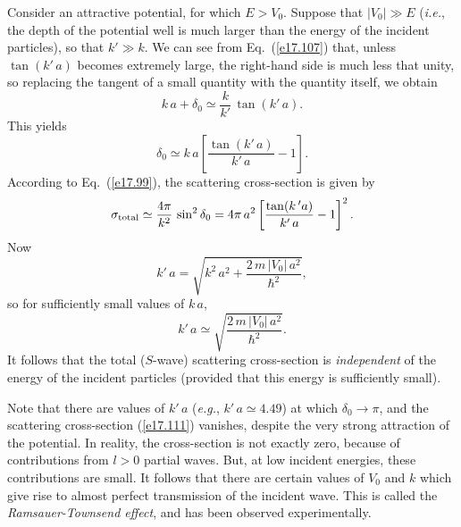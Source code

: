 Consider an attractive potential, for which $E>V_0$. Suppose that 
$|V_0|\gg E$ ({\em i.e.}, the depth of the potential well is much larger than
the energy of the incident particles), so that $k' \gg k$. We can see
from Eq.~(\ref{e17.107}) that, unless $\tan (k'\,a)$ becomes extremely large, the right-hand side is much less that unity, so replacing the tangent of a
small quantity with the quantity itself, we obtain
\begin{equation}
k\,a + \delta_0 \simeq \frac{k}{k'}\,\tan (k'\,a).
\end{equation}
This yields
\begin{equation}
\delta_0 \simeq k\,a \left[ \frac{\tan( k'\,a)}{k'\,a} -1\right].
\end{equation}
According to Eq.~(\ref{e17.99}), the scattering cross-section is given by
\begin{equation}\label{e17.111}
\sigma_{\rm total} \simeq \frac{4\pi}{k^2}\, \sin^2\delta_0
=4\pi \,a^2\left[\frac{\tan (k\,'a)}{k'\,a} -1\right]^2.
\end{equation}
Now
\begin{equation}\label{e17.112}
k'\,a = \sqrt{ k^2 \,a^2 + \frac{2 \,m \,|V_0|\, a^2}{\hbar^2}},
\end{equation}
so for sufficiently small values of $k\,a$,
\begin{equation}
k' \,a \simeq \sqrt{\frac{2\, m \,|V_0|\, a^2}{\hbar^2}}.
\end{equation}
It follows that the total ($S$-wave) scattering cross-section is {\em independent}\/
of the energy of the incident particles (provided that this energy is
sufficiently small). 

Note that there are values of $k'\,a$ ({\em e.g.}, $k'\,a\simeq 4.49$) at which
$\delta_0\rightarrow \pi$, and 
the scattering cross-section (\ref{e17.111}) vanishes, despite the very strong
attraction of the potential. In reality, the cross-section is not
exactly zero, because of contributions from $l>0$ partial waves. But,
at low incident energies, these contributions are small. It follows that
there are certain values of $V_0$ and $k$ which give rise to almost perfect 
transmission of the incident wave. This is called the {\em Ramsauer-Townsend
effect}, and has been observed experimentally. 

